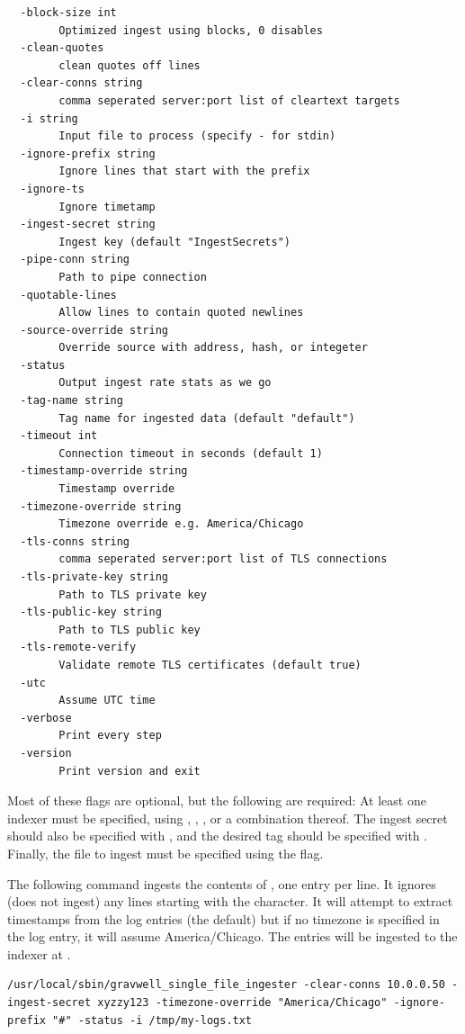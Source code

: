 \begin{verbatim}
  -block-size int
    	Optimized ingest using blocks, 0 disables
  -clean-quotes
    	clean quotes off lines
  -clear-conns string
    	comma seperated server:port list of cleartext targets
  -i string
    	Input file to process (specify - for stdin)
  -ignore-prefix string
    	Ignore lines that start with the prefix
  -ignore-ts
    	Ignore timetamp
  -ingest-secret string
    	Ingest key (default "IngestSecrets")
  -pipe-conn string
    	Path to pipe connection
  -quotable-lines
    	Allow lines to contain quoted newlines
  -source-override string
    	Override source with address, hash, or integeter
  -status
    	Output ingest rate stats as we go
  -tag-name string
    	Tag name for ingested data (default "default")
  -timeout int
    	Connection timeout in seconds (default 1)
  -timestamp-override string
    	Timestamp override
  -timezone-override string
    	Timezone override e.g. America/Chicago
  -tls-conns string
    	comma seperated server:port list of TLS connections
  -tls-private-key string
    	Path to TLS private key
  -tls-public-key string
    	Path to TLS public key
  -tls-remote-verify
    	Validate remote TLS certificates (default true)
  -utc
    	Assume UTC time
  -verbose
    	Print every step
  -version
    	Print version and exit
\end{verbatim}

Most of these flags are optional, but the following are required: At least one indexer must be specified, using , , , or a combination thereof. The ingest secret should also be specified with , and the desired tag should be specified with . Finally, the file to ingest must be specified using the  flag.

The following command ingests the contents of , one entry per line. It ignores (does not ingest) any lines starting with the \code{\#} character. It will attempt to extract timestamps from the log entries (the default) but if no timezone is specified in the log entry, it will assume America/Chicago. The entries will be ingested to the indexer at .

\begin{verbatim}
/usr/local/sbin/gravwell_single_file_ingester -clear-conns 10.0.0.50 -ingest-secret xyzzy123 -timezone-override "America/Chicago" -ignore-prefix "#" -status -i /tmp/my-logs.txt
\end{verbatim}

